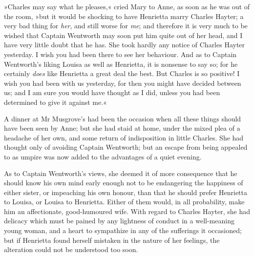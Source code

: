 »Charles may say what he pleases,« cried Mary to Anne, as soon as he was out of the room, »but it would be shocking to have Henrietta marry Charles Hayter; a very bad thing for \textit{her}, and still worse for \textit{me}; and therefore it is very much to be wished that Captain Wentworth may soon put him quite out of her head, and I have very little doubt that he has. She took hardly any notice of Charles Hayter yesterday. I wish you had been there to see her behaviour. And as to Captain Wentworth's liking Louisa as well as Henrietta, it is nonsense to say so; for he certainly \textit{does} like Henrietta a great deal the best. But Charles is so positive! I wish you had been with us yesterday, for then you might have decided between us; and I am sure you would have thought as I did, unless you had been determined to give it against me.«

A dinner at Mr Musgrove's had been the occasion when all these things should have been seen by Anne; but she had staid at home, under the mixed plea of a headache of her own, and some return of indisposition in little Charles. She had thought only of avoiding Captain Wentworth; but an escape from being appealed to as umpire was now added to the advantages of a quiet evening.

As to Captain Wentworth's views, she deemed it of more consequence that he should know his own mind early enough not to be endangering the happiness of either sister, or impeaching his own honour, than that he should prefer Henrietta to Louisa, or Louisa to Henrietta. Either of them would, in all probability, make him an affectionate, good-humoured wife. With regard to Charles Hayter, she had delicacy which must be pained by any lightness of conduct in a well-meaning young woman, and a heart to sympathize in any of the sufferings it occasioned; but if Henrietta found herself mistaken in the nature of her feelings, the alteration could not be understood too soon.

